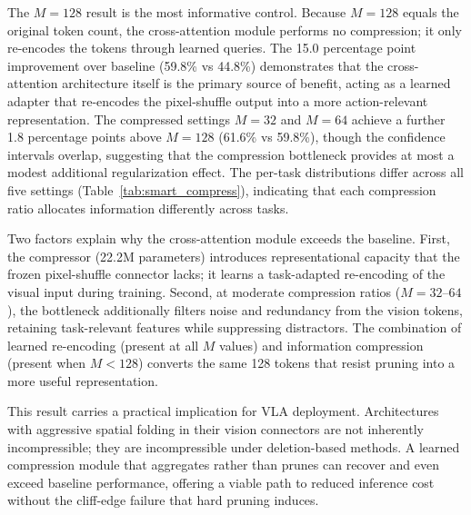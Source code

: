 The $M = 128$ result is the most informative control. Because $M = 128$ equals the original token count, the cross-attention module performs no compression; it only re-encodes the tokens through learned queries. The 15.0 percentage point improvement over baseline (59.8\% vs 44.8\%) demonstrates that the cross-attention architecture itself is the primary source of benefit, acting as a learned adapter that re-encodes the pixel-shuffle output into a more action-relevant representation. The compressed settings $M = 32$ and $M = 64$ achieve a further 1.8 percentage points above $M = 128$ (61.6\% vs 59.8\%), though the confidence intervals overlap, suggesting that the compression bottleneck provides at most a modest additional regularization effect. The per-task distributions differ across all five settings (Table~\ref{tab:smart_compress}), indicating that each compression ratio allocates information differently across tasks.

Two factors explain why the cross-attention module exceeds the baseline. First, the compressor (22.2M parameters) introduces representational capacity that the frozen pixel-shuffle connector lacks; it learns a task-adapted re-encoding of the visual input during training. Second, at moderate compression ratios ($M = 32$--$64$), the bottleneck additionally filters noise and redundancy from the vision tokens, retaining task-relevant features while suppressing distractors. The combination of learned re-encoding (present at all $M$ values) and information compression (present when $M < 128$) converts the same 128 tokens that resist pruning into a more useful representation.

This result carries a practical implication for VLA deployment. Architectures with aggressive spatial folding in their vision connectors are not inherently incompressible; they are incompressible under deletion-based methods. A learned compression module that aggregates rather than prunes can recover and even exceed baseline performance, offering a viable path to reduced inference cost without the cliff-edge failure that hard pruning induces.
